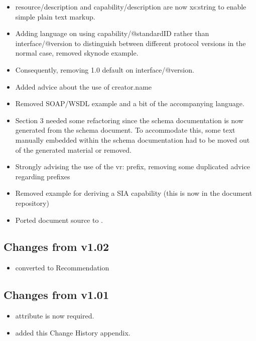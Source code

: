 \documentclass[11pt,a4paper]{ivoa}
\begin{document}
\begin{itemize}
\item resource/description and capability/description are now xs:string
to enable simple plain text markup.

\item Adding language on using capability/@standardID rather than
interface/@ver\-sion to distinguish between different protocol versions in
the normal case, removed skynode example.

\item Consequently, removing 1.0 default on interface/@version.

\item Added advice about the use of creator.name

\item Removed SOAP/WSDL example and a bit of the accompanying language.

\item Section 3 needed some refactoring since the schema documentation
is now generated from the schema document.  To accommodate this, some
text manually embedded within the schema documentation had to be moved
out of the generated material or removed.

\item Strongly advising the use of the vr: prefix, removing some
duplicated advice regarding prefixes

\item Removed example for deriving a SIA capability (this is now
in the document repository)

\item Ported document source to \ivoatex.
\end{itemize}

\subsection{Changes from v1.02}
\begin{itemize}
  \item converted to Recommendation
\end{itemize}

\subsection{Changes from v1.01}
\begin{itemize}
  \item {} attribute is now required.
  \item added this Change History appendix.
\end{itemize}
\end{document}
